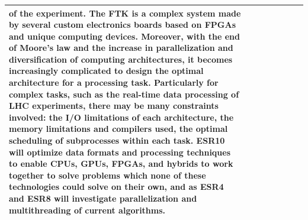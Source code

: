 \begin{center}
{\begin{tabular}{p{7mm}p{30mm}p{35mm}p{5mm}p{5mm}p{35mm}p{17mm}p{17mm}}
{of the experiment. The FTK is a complex system made by several
custom electronics boards based on FPGAs and unique computing devices.  %
Moreover, with the end of Moore's law and the increase in parallelization and diversification of computing
architectures, it becomes increasingly complicated to design the optimal architecture for a processing task. 
Particularly for complex tasks, such as the real-time data processing of LHC experiments, there may be many
constraints involved: the I/O limitations of each architecture,
the memory limitations and compilers used, the optimal scheduling of subprocesses within each task. 
ESR10 will optimize data formats and processing techniques to enable CPUs, GPUs, FPGAs, 
and hybrids to work together to solve problems which none of these technologies could solve on their own, 
and as ESR4 and ESR8 will investigate parallelization and multithreading of current algorithms.
} \tabularnewline \hline \midrule


\end{tabular}}
\end{center}

